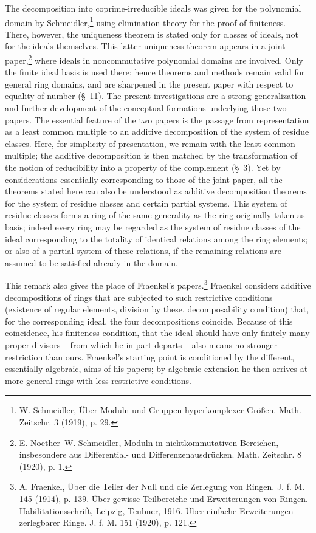 \documentclass[11pt]{article}
\begin{document}
The decomposition into coprime-irreducible ideals was given for the polynomial domain by Schmeidler,\footnote{W. Schmeidler, Über Moduln und Gruppen hyperkomplexer Größen. Math. Zeitschr. 3 (1919), p. 29.} using elimination theory for the proof of finiteness. There, however, the uniqueness theorem is stated only for classes of ideals, not for the ideals themselves. This latter uniqueness theorem appears in a joint paper,\footnote{E. Noether--W. Schmeidler, Moduln in nichtkommutativen Bereichen, insbesondere aus Differential- und Differenzenausdrücken. Math. Zeitschr. 8 (1920), p. 1.} where ideals in noncommutative polynomial domains are involved. Only the finite ideal basis is used there; hence theorems and methods remain valid for general ring domains, and are sharpened in the present paper with respect to equality of number (\S~11). The present investigations are a strong generalization and further development of the conceptual formations underlying those two papers. The essential feature of the two papers is the passage from representation as a least common multiple to an additive decomposition of the system of residue classes. Here, for simplicity of presentation, we remain with the least common multiple; the additive decomposition is then matched by the transformation of the notion of reducibility into a property of the complement (\S~3). Yet by considerations essentially corresponding to those of the joint paper, all the theorems stated here can also be understood as additive decomposition theorems for the system of residue classes and certain partial systems. This system of residue classes forms a ring of the same generality as the ring originally taken as basis; indeed every ring may be regarded as the system of residue classes of the ideal corresponding to the totality of identical relations among the ring elements; or also of a partial system of these relations, if the remaining relations are assumed to be satisfied already in the domain.

This remark also gives the place of Fraenkel's papers.\footnote{A. Fraenkel, Über die Teiler der Null und die Zerlegung von Ringen. J. f. M. 145 (1914), p. 139. Über gewisse Teilbereiche und Erweiterungen von Ringen. Habilitationsschrift, Leipzig, Teubner, 1916. Über einfache Erweiterungen zerlegbarer Ringe. J. f. M. 151 (1920), p. 121.} Fraenkel considers additive decompositions of rings that are subjected to such restrictive conditions (existence of regular elements, division by these, decomposability condition) that, for the corresponding ideal, the four decompositions coincide. Because of this coincidence, his finiteness condition, that the ideal should have only finitely many proper divisors -- from which he in part departs -- also means no stronger restriction than ours. Fraenkel's starting point is conditioned by the different, essentially algebraic, aims of his papers; by algebraic extension he then arrives at more general rings with less restrictive conditions.
\end{document}
